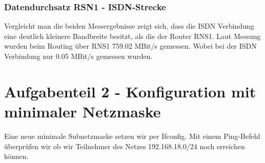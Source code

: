 \subsection{Datendurchsatz RSN1 - ISDN-Strecke}
Vergleicht man die beiden Messergebnisse zeigt sich, dass die ISDN Verbindung eine deutlich kleinere Bandbreite besitzt, als die der Router RNS1.
Laut Messung wurden beim Routing über RNS1 759.02 MBit/s gemessen. Wobei bei der ISDN Verbindung nur 0.05 MBit/s gemessen wurden.

\chapter{Aufgabenteil 2 - Konfiguration mit minimaler Netzmaske}
\lstset{           
		basicstyle=\ttfamily\footnotesize
       }
Eine neue minimale Subnetzmaske setzen wir per Ifconfig. Mit einem Ping-Befehl überprüfen wir ob wir Teilnehmer des Netzes 192.168.18.0/24 noch erreichen können.


